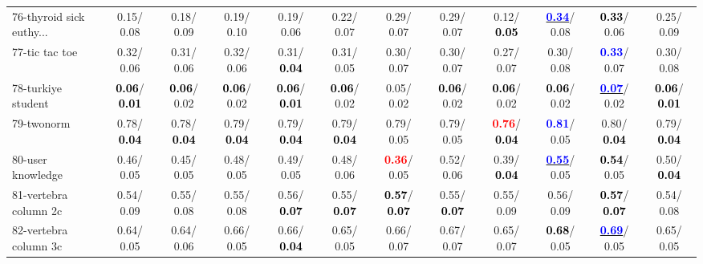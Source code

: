 \begin{table}[h]
\begin{center}
{\begin{tabular}{lc|c|c|c|c|c|c|c|c|c|c}
76-thyroid sick euthy... &   0.15/  0.08 &   0.18/  0.09 &   0.19/  0.10 &   0.19/  0.06 &   0.22/  0.07 &   0.29/  0.07 &   0.29/  0.07 &   0.12/\textcolor{black}{\textbf{  0.05}} & \underline{\textcolor{blue}{\textbf{  0.34}}}/  0.08 & \textcolor{black}{\textbf{  0.33}}/  0.06 &   0.25/  0.09 \\
77-tic tac toe &   0.32/  0.06 &   0.31/  0.06 &   0.32/  0.06 &   0.31/\textcolor{black}{\textbf{  0.04}} &   0.31/  0.05 &   0.30/  0.07 &   0.30/  0.07 &   0.27/  0.07 &   0.30/  0.08 & \textcolor{blue}{\textbf{  0.33}}/  0.07 &   0.30/  0.08 \\
78-turkiye student & \textcolor{black}{\textbf{  0.06}}/\textcolor{black}{\textbf{  0.01}} & \textcolor{black}{\textbf{  0.06}}/  0.02 & \textcolor{black}{\textbf{  0.06}}/  0.02 & \textcolor{black}{\textbf{  0.06}}/\textcolor{black}{\textbf{  0.01}} & \textcolor{black}{\textbf{  0.06}}/  0.02 &   0.05/  0.02 & \textcolor{black}{\textbf{  0.06}}/  0.02 & \textcolor{black}{\textbf{  0.06}}/  0.02 & \textcolor{black}{\textbf{  0.06}}/  0.02 & \underline{\textcolor{blue}{\textbf{  0.07}}}/  0.02 & \textcolor{black}{\textbf{  0.06}}/\textcolor{black}{\textbf{  0.01}} \\ \hline
79-twonorm &   0.78/\textcolor{black}{\textbf{  0.04}} &   0.78/\textcolor{black}{\textbf{  0.04}} &   0.79/\textcolor{black}{\textbf{  0.04}} &   0.79/\textcolor{black}{\textbf{  0.04}} &   0.79/\textcolor{black}{\textbf{  0.04}} &   0.79/  0.05 &   0.79/  0.05 & \textcolor{red}{\textbf{  0.76}}/\textcolor{black}{\textbf{  0.04}} & \textcolor{blue}{\textbf{  0.81}}/  0.05 &   0.80/\textcolor{black}{\textbf{  0.04}} &   0.79/\textcolor{black}{\textbf{  0.04}} \\
80-user knowledge &   0.46/  0.05 &   0.45/  0.05 &   0.48/  0.05 &   0.49/  0.05 &   0.48/  0.06 & \textcolor{red}{\textbf{  0.36}}/  0.05 &   0.52/  0.06 &   0.39/\textcolor{black}{\textbf{  0.04}} & \underline{\textcolor{blue}{\textbf{  0.55}}}/  0.05 & \textcolor{black}{\textbf{  0.54}}/  0.05 &   0.50/\textcolor{black}{\textbf{  0.04}} \\
81-vertebra column 2c &   0.54/  0.09 &   0.55/  0.08 &   0.55/  0.08 &   0.56/\textcolor{black}{\textbf{  0.07}} &   0.55/\textcolor{black}{\textbf{  0.07}} & \textcolor{black}{\textbf{  0.57}}/\textcolor{black}{\textbf{  0.07}} &   0.55/\textcolor{black}{\textbf{  0.07}} &   0.55/  0.09 &   0.56/  0.09 & \textcolor{black}{\textbf{  0.57}}/\textcolor{black}{\textbf{  0.07}} &   0.54/  0.08 \\
82-vertebra column 3c &   0.64/  0.05 &   0.64/  0.06 &   0.66/  0.05 &   0.66/\textcolor{black}{\textbf{  0.04}} &   0.65/  0.05 &   0.66/  0.07 &   0.67/  0.07 &   0.65/  0.07 & \textcolor{black}{\textbf{  0.68}}/  0.05 & \underline{\textcolor{blue}{\textbf{  0.69}}}/  0.05 &   0.65/  0.05 \\

\end{tabular}}
\end{center}
\end{table}
